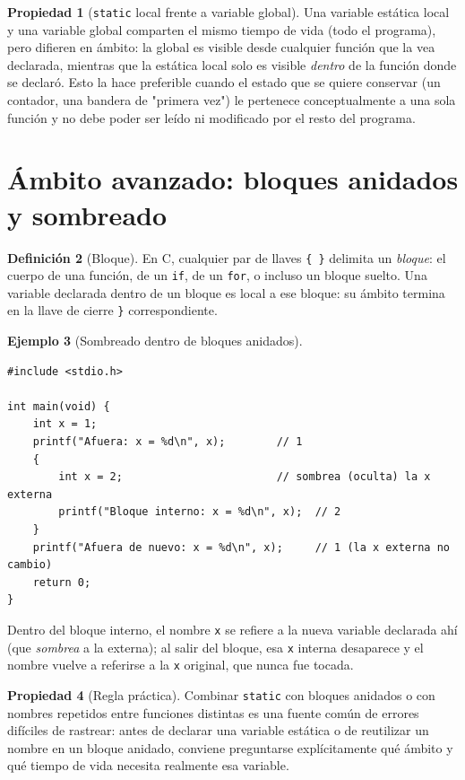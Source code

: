 \documentclass[11pt,letterpaper]{article}
\theoremstyle{definition}
\newtheorem{definicion}{Definición}[section]
\newtheorem{ejemplo}[definicion]{Ejemplo}
\newtheorem{propiedad}[definicion]{Propiedad}
\begin{document}
\begin{propiedad}[\texttt{static} local frente a variable global]
Una variable estática local y una variable global comparten el mismo tiempo de vida (todo el
programa), pero difieren en ámbito: la global es visible desde cualquier función que la vea
declarada, mientras que la estática local solo es visible \emph{dentro} de la función donde se
declaró. Esto la hace preferible cuando el estado que se quiere conservar (un contador, una
bandera de "primera vez") le pertenece conceptualmente a una sola función y no debe poder ser leído
ni modificado por el resto del programa.
\end{propiedad}

\section{Ámbito avanzado: bloques anidados y sombreado}

\begin{definicion}[Bloque]
En C, cualquier par de llaves \texttt{\{ \}} delimita un \emph{bloque}: el cuerpo de una función,
de un \texttt{if}, de un \texttt{for}, o incluso un bloque suelto. Una variable declarada dentro de
un bloque es local a ese bloque: su ámbito termina en la llave de cierre \texttt{\}}
correspondiente.
\end{definicion}

\begin{ejemplo}[Sombreado dentro de bloques anidados]
\begin{lstlisting}
#include <stdio.h>

int main(void) {
    int x = 1;
    printf("Afuera: x = %d\n", x);        // 1
    {
        int x = 2;                        // sombrea (oculta) la x externa
        printf("Bloque interno: x = %d\n", x);  // 2
    }
    printf("Afuera de nuevo: x = %d\n", x);     // 1 (la x externa no cambio)
    return 0;
}
\end{lstlisting}
Dentro del bloque interno, el nombre \texttt{x} se refiere a la nueva variable declarada ahí (que
\emph{sombrea} a la externa); al salir del bloque, esa \texttt{x} interna desaparece y el nombre
vuelve a referirse a la \texttt{x} original, que nunca fue tocada.
\end{ejemplo}

\begin{propiedad}[Regla práctica]
Combinar \texttt{static} con bloques anidados o con nombres repetidos entre funciones distintas es
una fuente común de errores difíciles de rastrear: antes de declarar una variable estática o de
reutilizar un nombre en un bloque anidado, conviene preguntarse explícitamente qué ámbito y qué
tiempo de vida necesita realmente esa variable.
\end{propiedad}
\end{document}
